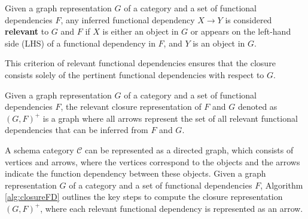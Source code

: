 
\begin{definition} Given a graph representation $G$ of a category and a set of functional dependencies $F$, any inferred functional dependency $X \to Y$ is considered \textbf{relevant} to $G$ and $F$ if $X$ is either an object in $G$ or appears on the left-hand side (LHS) of a functional dependency in $F$, and $Y$ is an object in $G$.
\end{definition} 

This criterion of relevant functional dependencies ensures that the closure consists solely of the pertinent functional dependencies with respect to $G$.


\begin{definition} 
Given a graph representation $G$ of a category and a set of functional dependencies $F$, the relevant closure representation of $F$ and $G$ denoted as $(G,F)^+$ is a graph where all arrows represent the set of all relevant functional dependencies that can be inferred from $F$ and $G$.

\end{definition}

A schema category $\mathcal{C}$ can be represented as a directed graph, which consists of vertices and arrows, where the vertices correspond to the objects and the arrows indicate the function dependency between these objects. Given a graph representation $G$ of a category and a set of functional dependencies $F$, Algorithm \ref{alg:closureFD} outlines the key steps to compute the closure representation $(G,F)^+$, where each relevant functional dependency is represented as an arrow.







